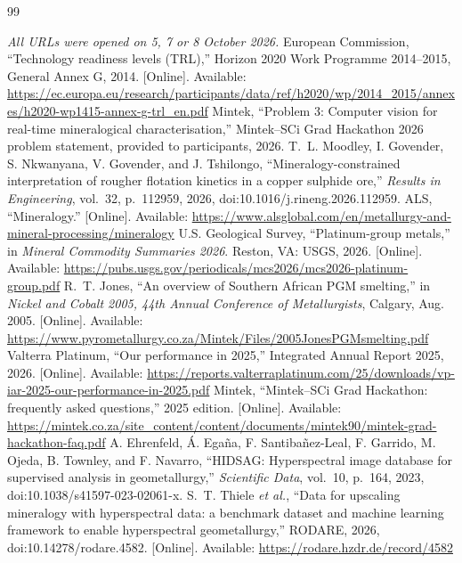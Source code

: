 \documentclass[10pt,a4paper,twocolumn]{article}
\begin{document}
\scriptsize
\begin{thebibliography}{99}\setlength{\itemsep}{-2.2pt}
\item[] \hspace{-\labelsep}\textit{All URLs were opened on 5, 7 or 8 October 2026.}
 European Commission, ``Technology readiness levels (TRL),'' Horizon 2020 Work Programme 2014--2015, General Annex G, 2014. [Online]. Available: \url{https://ec.europa.eu/research/participants/data/ref/h2020/wp/2014_2015/annexes/h2020-wp1415-annex-g-trl_en.pdf}
 Mintek, ``Problem 3: Computer vision for real-time mineralogical characterisation,'' Mintek--SCi Grad Hackathon 2026 problem statement, provided to participants, 2026.
 T.~L. Moodley, I. Govender, S. Nkwanyana, V. Govender, and J. Tshilongo, ``Mineralogy-constrained interpretation of rougher flotation kinetics in a copper sulphide ore,'' \emph{Results in Engineering}, vol.~32, p.~112959, 2026, doi:10.1016/j.rineng.2026.112959.
 ALS, ``Mineralogy.'' [Online]. Available: \url{https://www.alsglobal.com/en/metallurgy-and-mineral-processing/mineralogy}
 U.S. Geological Survey, ``Platinum-group metals,'' in \emph{Mineral Commodity Summaries 2026}. Reston, VA: USGS, 2026. [Online]. Available: \url{https://pubs.usgs.gov/periodicals/mcs2026/mcs2026-platinum-group.pdf}
 R.~T. Jones, ``An overview of Southern African PGM smelting,'' in \emph{Nickel and Cobalt 2005, 44th Annual Conference of Metallurgists}, Calgary, Aug. 2005. [Online]. Available: \url{https://www.pyrometallurgy.co.za/Mintek/Files/2005JonesPGMsmelting.pdf}
 Valterra Platinum, ``Our performance in 2025,'' Integrated Annual Report 2025, 2026. [Online]. Available: \url{https://reports.valterraplatinum.com/25/downloads/vp-iar-2025-our-performance-in-2025.pdf}
 Mintek, ``Mintek--SCi Grad Hackathon: frequently asked questions,'' 2025 edition. [Online]. Available: \url{https://mintek.co.za/site_content/content/documents/mintek90/mintek-grad-hackathon-faq.pdf}
 A. Ehrenfeld, \'{A}. Ega\~{n}a, F. Santiba\~{n}ez-Leal, F. Garrido, M. Ojeda, B. Townley, and F. Navarro, ``HIDSAG: Hyperspectral image database for supervised analysis in geometallurgy,'' \emph{Scientific Data}, vol.~10, p.~164, 2023, doi:10.1038/s41597-023-02061-x.
 S.~T. Thiele \emph{et al.}, ``Data for upscaling mineralogy with hyperspectral data: a benchmark dataset and machine learning framework to enable hyperspectral geometallurgy,'' RODARE, 2026, doi:10.14278/rodare.4582. [Online]. Available: \url{https://rodare.hzdr.de/record/4582}

\end{thebibliography}
\end{document}
